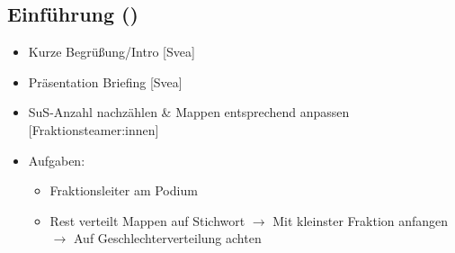 \documentclass{article}
\newcommand{\KOM}{Svea}
\begin{document}
	\subsection{Einführung (\timeEinf)}
	\begin{itemize}
		\item Kurze Begrüßung/Intro [\KOM]
		\item Präsentation Briefing [\KOM]
        \item SuS-Anzahl nachzählen \& Mappen entsprechend anpassen [Fraktionsteamer:innen]
        \item Aufgaben:
        \begin{itemize}
            \item Fraktionsleiter am Podium
            \item Rest verteilt Mappen auf Stichwort \newline
            $\to$ Mit kleinster Fraktion anfangen \newline
            $\to$ Auf Geschlechterverteilung achten
        \end{itemize}
    \end{itemize}
	
\end{document}

